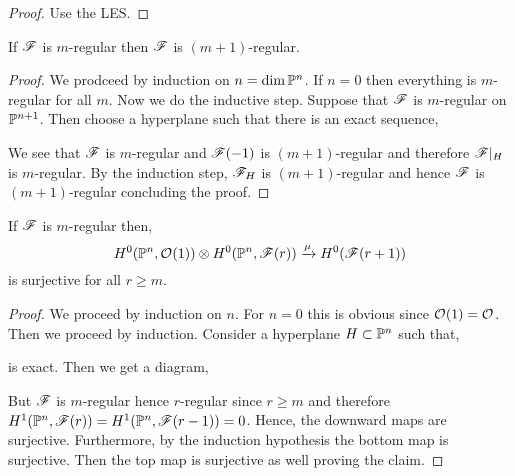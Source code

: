 \documentclass[12pt]{article}
\begin{document}
\begin{proof}
Use the LES.
\end{proof}

\begin{prop}
If $\F$ is $m$-regular then $\F$ is $(m+1)$-regular.
\end{prop}

\begin{proof}
We prodceed by induction on $n = \dim{\P^n}$. If $n = 0$ then everything is $m$-regular for all $m$. Now we do the inductive step. Suppose that $\F$ is $m$-regular on $\P^{n+1}$. Then choose a hyperplane such that there is an exact sequence,
\begin{center}
\end{center}
We see that $\F$ is $m$-regular and $\F(-1)$ is $(m+1)$-regular and therefore $\F|_H$ is $m$-regular. By the induction step, $\F_H$ is $(m+1)$-regular and hence $\F$ is $(m+1)$-regular concluding the proof. 
\end{proof}

\begin{prop}
If $\F$ is $m$-regular then,
\[ H^0(\P^n, \struct{}(1)) \ot H^0(\P^n, \F(r)) \xrightarrow{\mu} H^0(\F(r+1)) \]
is surjective for all $r \ge m$.
\end{prop}

\begin{proof}
We proceed by induction on $n$. For $n = 0$ this is obvious since $\struct{}(1) = \struct{}$. Then we proceed by induction. Consider a hyperplane $H \subset \P^n$ such that,
\begin{center}
\end{center}
is exact. Then we get a diagram,
\begin{center}
\end{center}
But $\F$ is $m$-regular hence $r$-regular since $r \ge m$ and therefore $H^1(\P^n, \F(r)) = H^1(\P^n, \F(r-1)) = 0$. Hence, the downward maps are surjective. Furthermore, by the induction hypothesis the bottom map is surjective. Then the top map is surjective as well proving the claim.
\end{proof}
\end{document}
